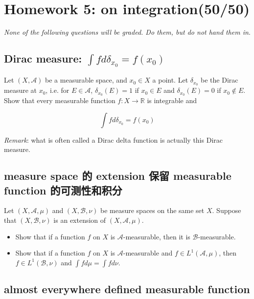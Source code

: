 \documentclass{qlnotes-export}
\begin{document}
\chapter{Homework 5: on integration(50/50)}\label{homework-5-on-integration5050}

\emph{None of the following questions will be graded. Do them, but do not hand them in}.

\section{\texorpdfstring{Dirac measure: \(\int f d\delta_{x_{0}} = f(x_{0})\)}{Dirac measure: \textbackslash int f d\textbackslash delta\_\{x\_\{0\}\} = f(x\_\{0\})}}\label{dirac-measure-int-f-ddelta_x_0-fx_0}

Let \((X,\mathcal{A})\) be a measurable space, and \(x_{0} \in X\) a point. Let \(\delta_{x_{0}}\) be the Dirac measure at \(x_{0}\), i.e. for \(E \in \mathcal{A}\), \(\delta_{x_{0}}(E) = 1\) if \(x_{0} \in E\) and \(\delta_{x_{0}}(E) = 0\) if \(x_{0} \notin E\). Show that every measurable function \(f:X\rightarrow{\mathbb{R}}\) is integrable and

\[\int f d\delta_{x_{0}} = f(x_{0})\]

\emph{Remark}: what is often called a Dirac delta function is actually this Dirac measure.

\section{measure space 的 extension 保留 measurable function 的可测性和积分}\label{measure-space-ux7684-extension-ux4fddux7559-measurable-function-ux7684ux53efux6d4bux6027ux548cux79efux5206}

Let \((X,\mathcal{A},\mu)\) and \((X,\mathcal{B},\nu)\) be measure spaces on the same set \(X\). Suppose that \((X,\mathcal{B},\nu)\) is an extension of \((X,\mathcal{A},\mu)\).

\begin{itemize}
\item
  Show that if a function \(f\) on \(X\) is \(\mathcal{A}\)-measurable, then it is \(\mathcal{B}\)-measurable.
\item
  Show that if a function \(f\) on \(X\) is \(\mathcal{A}\)-measurable and \(f \in L^{1}(\mathcal{A},\mu)\), then \(f \in L^{1}(\mathcal{B},\nu)\) and \(\int f d\mu = \int f d\nu\).
\end{itemize}

\section{almost everywhere defined measurable function}\label{almost-everywhere-defined-measurable-function}
\end{document}
